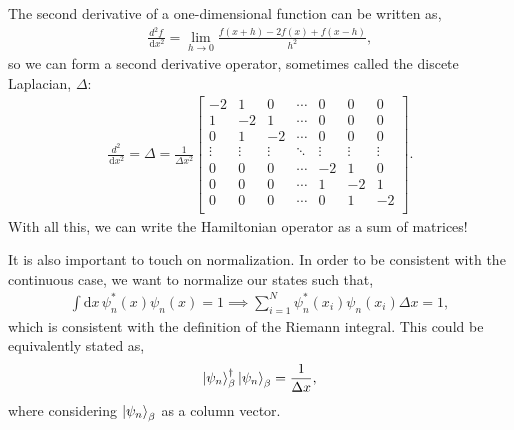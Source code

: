 \documentclass[10pt]{article}
\newcommand{\1}{\mathbf 1}
\begin{document}
The second derivative of a one-dimensional function can be written as,
\begin{align}
\frac{d^2f}{\,\mathrm{d} x^2}
=
\lim_{h\to 0}
\frac{f(x+h) - 2f(x)+f(x-h)}{h^2},
\end{align}
so we can form a second derivative operator, sometimes called the discete Laplacian, $\Delta$:
\begin{align}
\frac{d^2}{\,\mathrm{d} x^2} 
= \Delta
=
\frac{1}{\Delta x^2}
\begin{bmatrix}
-2 & 1 & 0  & \cdots &0 & 0 & 0 \\
1 & -2 & 1 & \cdots &0 & 0 & 0\\
0 & 1 & -2 & \cdots & 0 & 0 & 0\\
\vdots & \vdots & \vdots & \ddots & \vdots & \vdots & \vdots\\
0 & 0 & 0 & \cdots & -2 & 1 & 0\\
0 & 0 & 0 & \cdots & 1 & -2 & 1\\
0 & 0 & 0 & \cdots & 0 & 1 & -2\\
\end{bmatrix}.
\end{align}
With all this, we can write the Hamiltonian operator as a sum of matrices!

It is also important to touch on normalization.
In order to be consistent with the continuous case, we want to normalize our states such that,
\begin{align}
	\int \mathrm{d} x\, \psi_n^\ast(x)\psi_n(x)
	= 1
	\implies
	\sum_{i=1}^N
	\psi_n^\ast(x_i)\psi_n(x_i) \Delta x = 1,
\end{align}
which is consistent with the definition of the Riemann integral.
This could be equivalently stated as,
\begin{align}
	\ket{\psi_n}_\beta^\dagger
	\ket{\psi_n}_\beta
	=
	\frac{1}{\Delta x},
\end{align}
where considering $\ket{\psi_n}_\beta$ as a column vector.
\end{document}
